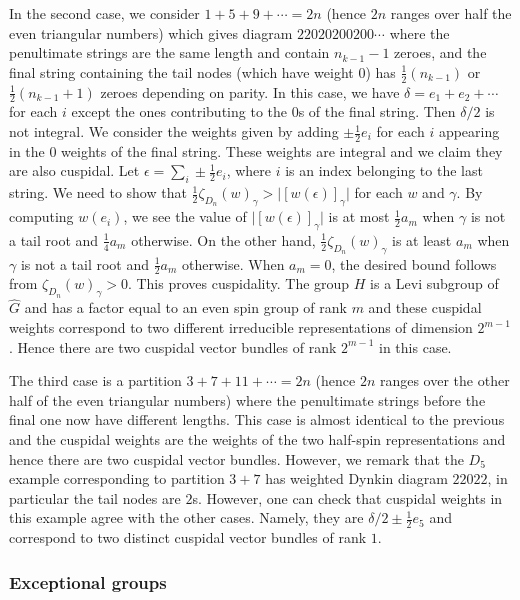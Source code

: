 \documentclass{amsart}
\theoremstyle{definition}
\theoremstyle{remark}
\numberwithin{equation}{section}
\newcommand{\wh}{\widehat}
\begin{document}
In the second case, we consider $1+5+9+\cdots=2n$ (hence $2n$ ranges over half the even triangular numbers) which gives diagram $22020200200\cdots$ where the penultimate strings are the same length and contain $n_{k-1} - 1$ zeroes, and the final string containing the tail nodes (which have weight $0$) has $\frac{1}{2}(n_{k-1})$ or $\frac{1}{2}(n_{k-1} + 1)$ zeroes depending on parity. In this case, we have $\delta = e_1+e_2+\cdots$ for each $i$ except the ones contributing to the $0$s of the final string. Then $\delta/2$ is not integral. We consider the weights given by adding $\pm \frac{1}{2}e_i$ for each $i$ appearing in the $0$ weights of the final string. These weights are integral and we claim they are also cuspidal. Let $\epsilon = \sum\limits_i \pm \frac{1}{2}e_i$, where $i$ is an index belonging to the last string. We need to show that $\frac{1}{2} \zeta_{D_n}(w)_{\gamma} > \lvert[w(\epsilon)]_{\gamma}\rvert$ for each $w$ and $\gamma$. By computing $w(e_i)$, we see the value of $\lvert [w(\epsilon)]_{\gamma}\rvert$ is at most $\frac{1}{2}a_m$ when $\gamma$ is not a tail root and $\frac{1}{4}a_m$ otherwise. On the other hand, $\frac{1}{2}\zeta_{D_n}(w)_{\gamma}$ is at least $a_m$ when $\gamma$ is not a tail root and $\frac{1}{2}a_m$ otherwise. When $a_m=0$, the desired bound follows from $\zeta_{D_n}(w)_{\gamma} > 0$. This proves cuspidality. The group $H$ is a Levi subgroup of $\wh{G}$ and has a factor equal to an even spin group of rank $m$ and these cuspidal weights correspond to two different irreducible representations of dimension $2^{m-1}$. Hence there are two cuspidal vector bundles of rank $2^{m-1}$ in this case. 

The third case is a partition $3+7+11+\cdots=2n$ (hence $2n$ ranges over the other half of the even triangular numbers) where the penultimate strings before the final one now have different lengths. This case is almost identical to the previous and the cuspidal weights are the weights of the two half-spin representations and hence there are two cuspidal vector bundles. However, we remark that the $D_5$ example corresponding to partition $3+7$ has weighted Dynkin diagram $22022$, in particular the tail nodes are $2$s. However, one can check that cuspidal weights in this example agree with the other cases. Namely, they are $\delta/2 \pm \frac{1}{2}e_5$ and correspond to two distinct cuspidal vector bundles of rank $1$.

\subsubsection{Exceptional groups}{\label{sss: exceptionalgroups}}
\end{document}
